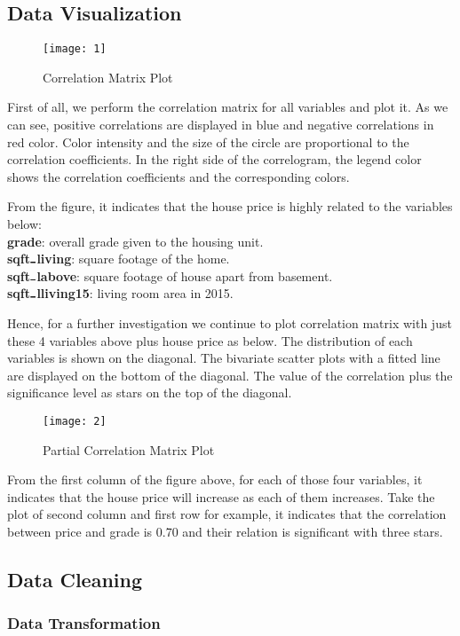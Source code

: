 \documentclass[12pt,twocolumn,twoside]{article}
\begin{document}
\subsection{Data Visualization}
\begin{figure}[h]
\texttt{[image: 1]}
\caption{ Correlation Matrix Plot}
\end{figure}
First of all, we perform the correlation matrix for all variables and plot it. As we can see, positive correlations are displayed in blue and negative correlations in red color. Color intensity and the size of the circle are proportional to the correlation coefficients. In the right side of the correlogram, the legend color shows the correlation coefficients and the corresponding colors.

From the figure, it indicates that the house price is highly related to the variables below:\\
\textbf{grade}: overall grade given to the housing unit.\\
\textbf{sqft$\rule{0.15cm}{0.3mm}$living}:  square footage of the home.\\
\textbf{sqft$\rule{0.15cm}{0.3mm}$labove}: square footage of house apart from basement.\\
\textbf{sqft$\rule{0.15cm}{0.3mm}$lliving15}: living room area in 2015.

Hence, for a further investigation we continue to plot correlation matrix with just these 4 variables above plus house price as below. The distribution of each variables is shown on the diagonal. The bivariate scatter plots with a fitted line are displayed on the bottom of the diagonal. The value of the correlation plus the significance level as stars on the top of the diagonal.
\begin{figure}[h]
\texttt{[image: 2]}
\caption{Partial Correlation Matrix Plot}
\end{figure}
From the first column of the figure above, for each of those four variables, it indicates that the house price will increase as each of them increases. Take the plot of second column and first row for example, it indicates that the correlation between price and grade is 0.70 and their relation is significant with three stars.
\subsection{Data Cleaning}
\subsubsection{Data Transformation}
\end{document}
